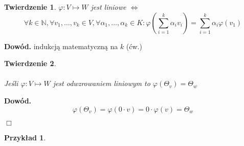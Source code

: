 \documentclass[a5paper,8pt]{article}
\newtheorem{example}{Przykład}[section]
\newtheorem{theorem}{Twierdzenie}[section]
\begin{document}
    \begin{theorem}
        $ \varphi: V \mapsto W $ jest liniowe $ \Longleftrightarrow $ \\
        \begin{equation*}
            \forall k \in \mathbb{N}, \forall v_1, \ldots, v_k \in V,
            \forall \alpha_1, \ldots, \alpha_k \in K:
            \varphi(\sum_{i = 1}^{k} \alpha_i v_i ) = \sum_{i = 1}^{k} \alpha_i \varphi(v_1)
        \end{equation*}
    \end{theorem}

    \large{\textbf{Dowód.}} indukcją matematyczną na $k$ (ćw.)

    \begin{theorem} \hfill \\\\
        Jeśli $ \varphi: V \mapsto W $ jest odwzrowaniem liniowym to
        $ \varphi(\Theta_v) = \Theta_w $
    \end{theorem}

    \large{\textbf{Dowód.}} \\
    \begin{equation*}
        \varphi(\Theta_v) = \varphi(0 \cdot v) = 0 \cdot \varphi(v) = \Theta_w
    \end{equation*}

    \begin{flushright}
        $ \Box $
    \end{flushright}

    \begin{example}
    \end{example}
\end{document}
